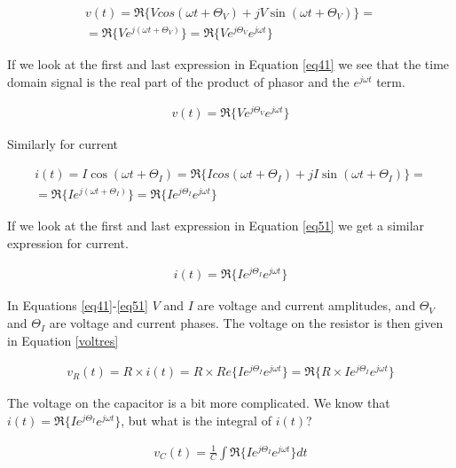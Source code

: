 \documentclass{ximera}
\begin{document}
\begin{example}
\begin{eqnarray}
v(t)= \Re\{ V cos (\omega t + \Theta_V ) + j V \sin (\omega t + \Theta_V)\}= \nonumber \\ =\Re\{V e^{j(\omega t + \Theta_V)}\}=\Re\{V e^{j \Theta_V} e^{j \omega t}\} \label{eq41}
\end{eqnarray}

If we look at the first and last expression in Equation \ref{eq41} we see that the time domain signal is  the real part of the product of phasor and  the $e^{j \omega t}$ term. 

\begin{eqnarray}
v(t)=\Re\{V e^{j \Theta_V} e^{j \omega t}\} \label{eq41a} 
\end{eqnarray}

Similarly for current

\begin{eqnarray}
i(t)= I \cos (\omega t + \Theta_I) =\Re\{ I cos (\omega t + \Theta_I) + j I \sin (\omega t + \Theta_I)\}= \nonumber \\ =\Re\{I e^{j(\omega t + \Theta_I)}\}=\Re\{I e^{j \Theta_I} e^{j \omega t}\} \label{eq51} 
\end{eqnarray}




If we look at the first and last expression in Equation \ref{eq51} we get a similar expression for current.

\begin{eqnarray}
i(t)= \Re\{I e^{j \Theta_I} e^{j \omega t}\} \label{eq51a}
\end{eqnarray}



 In Equations  \ref{eq41}-\ref{eq51}    $V$ and $I$ are voltage and current amplitudes, and $\Theta_V $ and $\Theta_I$  are voltage and current phases. The voltage on the resistor is then given in Equation \ref{voltres} 

\begin{eqnarray}
v_R(t)=R \times  i(t) =  R \times  Re\{I e^{j \Theta_I} e^{j \omega t}\}  =   \Re\{R \times I e^{j \Theta_I} e^{j \omega t}\}   \label{voltres}
\end{eqnarray}

The voltage on the capacitor is a bit more complicated. We know that $i(t)=\Re\{I e^{j \Theta_I} e^{j \omega t}\}$, but what is the integral of $i(t)$?



\begin{eqnarray}
v_C(t) =  \frac{1}{C} \int \Re\{I e^{j \Theta_I} e^{j \omega t}\}  dt \label{eq6}
\end{eqnarray} 


\end{example}
\end{document}
